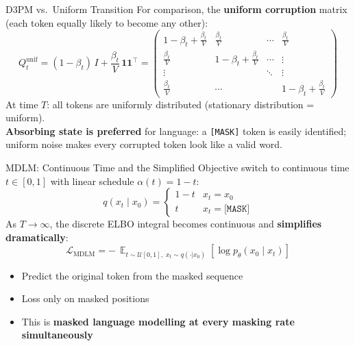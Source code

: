 \documentclass[10pt, aspectratio=169]{beamer}
\DeclareMathOperator*{\E}{\mathbb{E}}
\newcommand{\MASK}{\texttt{[MASK]}}
\begin{document}
\begin{frame}{D3PM vs.\ Uniform Transition}
  For comparison, the \textbf{uniform corruption} matrix (each token equally likely to become any other):
  \[
    Q_t^{\mathrm{unif}}
    = (1-\beta_t)\,I + \frac{\beta_t}{V}\,\mathbf{1}\mathbf{1}^\top
    = \begin{pmatrix}
        1-\beta_t+\tfrac{\beta_t}{V} & \tfrac{\beta_t}{V} & \cdots & \tfrac{\beta_t}{V}\\
        \tfrac{\beta_t}{V} & 1-\beta_t+\tfrac{\beta_t}{V} & \cdots & \vdots\\
        \vdots & & \ddots & \vdots\\
        \tfrac{\beta_t}{V} & \cdots & & 1-\beta_t+\tfrac{\beta_t}{V}
      \end{pmatrix}
  \]
  At time $T$: all tokens are uniformly distributed (stationary distribution = uniform).\\[6pt]
  \textbf{Absorbing state is preferred} for language: a \MASK{} token is easily identified; uniform noise makes every corrupted token look like a valid word.
\end{frame}

\begin{frame}{MDLM: Continuous Time and the Simplified Objective}
  \citet{sahoo2024mdlm} switch to continuous time $t\in[0,1]$ with linear schedule $\alpha(t)=1-t$:
  \[
    q(x_t\mid x_0) = \begin{cases} 1-t & x_t = x_0 \\ t & x_t = \MASK \end{cases}
  \]
  As $T\to\infty$, the discrete ELBO integral becomes continuous and \textbf{simplifies dramatically}:
  \[
    \boxed{
      \mathcal{L}_{\mathrm{MDLM}}
      = -\,\E_{t\sim\mathcal{U}[0,1],\; x_t \sim q(\cdot|x_0)}\!\left[\log p_\theta(x_0 \mid x_t)\right]
    }
  \]
  \begin{itemize}
    \item Predict the original token from the masked sequence
    \item Loss only on masked positions
    \item This is \textbf{masked language modelling at every masking rate simultaneously}
  \end{itemize}
\end{frame}
\end{document}
